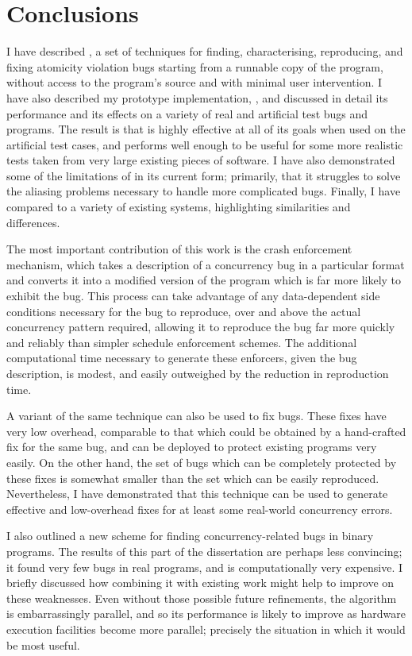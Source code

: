 \cleardoublepage
\chapter{Conclusions}
\label{sect:concl}

I have described {\technique}, a set of techniques for finding,
characterising, reproducing, and fixing atomicity violation bugs
starting from a runnable copy of the program, without access to the
program's source and with minimal user intervention.  I have also
described my prototype implementation, {\implementation}, and
discussed in detail its performance and its effects on a variety of
real and artificial test bugs and programs.  The result is that
{\technique} is highly effective at all of its goals when used on the
artificial test cases, and performs well enough to be useful for some
more realistic tests taken from very large existing pieces of
software.  I have also demonstrated some of the limitations of
{\technique} in its current form; primarily, that it struggles to
solve the aliasing problems necessary to handle more complicated bugs.
Finally, I have compared {\technique} to a variety of existing
systems, highlighting similarities and differences.

The most important contribution of this work is the crash enforcement
mechanism, which takes a description of a concurrency bug in a
particular format and converts it into a modified version of the
program which is far more likely to exhibit the bug.  This process can
take advantage of any data-dependent side conditions necessary for the
bug to reproduce, over and above the actual concurrency pattern
required, allowing it to reproduce the bug far more quickly and
reliably than simpler schedule enforcement schemes.  The additional
computational time necessary to generate these enforcers, given the
bug description, is modest, and easily outweighed by the reduction in
reproduction time.

A variant of the same technique can also be used to fix bugs.  These
fixes have very low overhead, comparable to that which could be
obtained by a hand-crafted fix for the same bug, and can be deployed
to protect existing programs very easily.  On the other hand, the set
of bugs which can be completely protected by these fixes is somewhat
smaller than the set which can be easily reproduced.  Nevertheless, I
have demonstrated that this technique can be used to generate
effective and low-overhead fixes for at least some real-world
concurrency errors.

I also outlined a new scheme for finding concurrency-related bugs in
binary programs.  The results of this part of the dissertation are
perhaps less convincing; it found very few bugs in real programs, and
is computationally very expensive.  I briefly discussed how combining
it with existing work might help to improve on these weaknesses.  Even
without those possible future refinements, the algorithm is
embarrassingly parallel, and so its performance is likely to improve
as hardware execution facilities become more parallel; precisely the
situation in which it would be most useful.
